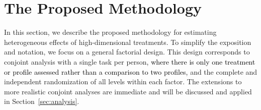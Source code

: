 \documentclass[11pt]{article}
\begin{document}





\section{The Proposed Methodology}\label{sec:methods}

In this section, we describe the proposed methodology for estimating
heterogeneous effects of high-dimensional treatments.  To simplify the
exposition and notation, we focus on a general factorial design.  This
design corresponds to conjoint analysis with a single task per person\textcolor{black}{, where there is only one treatment or profile assessed rather than a comparison to two profiles,}
and the complete and independent randomization of all levels within
each factor.  The extensions to more realistic conjoint analyses are
immediate and will be discussed and applied in
Section~\ref{sec:analysis}.  
\end{document}
